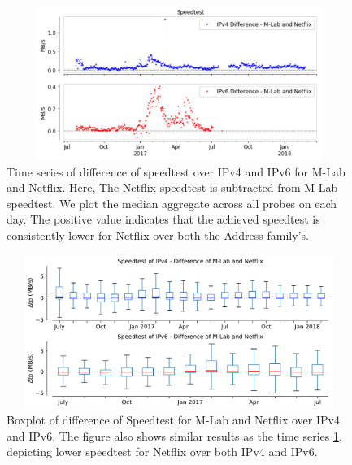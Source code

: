 \begin{figure}[!ht]
	\centering
	\includegraphics[keepaspectratio, height=5cm, width=15cm]{figures/mlab/netflix-throughput-timeseries-speedtest-netflix-difference.pdf}
	\caption[Speedtest Timeseries Delta]{Time series of difference of speedtest over IPv4 and IPv6 for M-Lab and Netflix. Here, The Netflix speedtest is subtracted from M-Lab speedtest. We plot the median aggregate across all probes on each day. The positive value indicates that
	the achieved speedtest is consistently lower for Netflix over both the Address family's.}
	\label{fig:Speedtest Timeseries Delta}
\end{figure}

\begin{figure}[!ht]
	\centering
	\includegraphics[keepaspectratio, height=5cm, width=15cm]{figures/mlab/netflix-throughput-boxplot-speedtest-difference.pdf}
	\caption[Speedtest Boxplot Delta]{Boxplot of difference of Speedtest for M-Lab and Netflix over IPv4 and IPv6. The figure also shows similar results as the time series \cref{fig:Speedtest Timeseries Delta}, depicting lower speedtest for Netflix over both IPv4 and IPv6.}
	\label{fig:Speedtest Boxplot Delta}
\end{figure}

